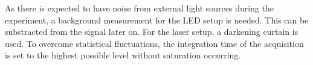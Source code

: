 As there is expected to have noise from external light sources during the experiment, a background measurement for the LED setup is needed.
This can be substracted from the signal later on.
For the laser setup, a darkening curtain is used. 
To overcome statistical fluctuations, the integration time of the acquisition is set to the highest possible level without saturation occurring.
